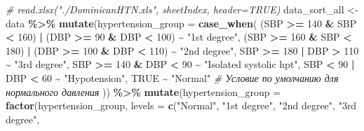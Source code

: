 \documentclass[
]{article}
\newenvironment{Shaded}{\begin{snugshade}}{\end{snugshade}}
\newcommand{\AttributeTok}[1]{\textcolor[rgb]{0.13,0.29,0.53}{#1}}
\newcommand{\CommentTok}[1]{\textcolor[rgb]{0.56,0.35,0.01}{\textit{#1}}}
\newcommand{\ConstantTok}[1]{\textcolor[rgb]{0.56,0.35,0.01}{#1}}
\newcommand{\DecValTok}[1]{\textcolor[rgb]{0.00,0.00,0.81}{#1}}
\newcommand{\FunctionTok}[1]{\textcolor[rgb]{0.13,0.29,0.53}{\textbf{#1}}}
\newcommand{\NormalTok}[1]{#1}
\newcommand{\OtherTok}[1]{\textcolor[rgb]{0.56,0.35,0.01}{#1}}
\newcommand{\SpecialCharTok}[1]{\textcolor[rgb]{0.81,0.36,0.00}{\textbf{#1}}}
\newcommand{\StringTok}[1]{\textcolor[rgb]{0.31,0.60,0.02}{#1}}
\begin{document}
\begin{Shaded}
\begin{Highlighting}[]
\CommentTok{\# read.xlsx("./DominicanHTN.xls", sheetIndex, header=TRUE)}
\NormalTok{data\_sort\_all }\OtherTok{\textless{}{-}}\NormalTok{ data }\SpecialCharTok{\%\textgreater{}\%}
  \FunctionTok{mutate}\NormalTok{(}\AttributeTok{hypertension\_group =} \FunctionTok{case\_when}\NormalTok{(}
\NormalTok{    (SBP }\SpecialCharTok{\textgreater{}=} \DecValTok{140} \SpecialCharTok{\&}\NormalTok{ SBP }\SpecialCharTok{\textless{}} \DecValTok{160}\NormalTok{) }\SpecialCharTok{|}\NormalTok{ (DBP }\SpecialCharTok{\textgreater{}=} \DecValTok{90} \SpecialCharTok{\&}\NormalTok{ DBP }\SpecialCharTok{\textless{}} \DecValTok{100}\NormalTok{) }\SpecialCharTok{\textasciitilde{}} \StringTok{"1st degree"}\NormalTok{,}
\NormalTok{    (SBP }\SpecialCharTok{\textgreater{}=} \DecValTok{160} \SpecialCharTok{\&}\NormalTok{ SBP }\SpecialCharTok{\textless{}} \DecValTok{180}\NormalTok{) }\SpecialCharTok{|}\NormalTok{ (DBP }\SpecialCharTok{\textgreater{}=} \DecValTok{100} \SpecialCharTok{\&}\NormalTok{ DBP }\SpecialCharTok{\textless{}} \DecValTok{110}\NormalTok{) }\SpecialCharTok{\textasciitilde{}} \StringTok{"2nd degree"}\NormalTok{,}
\NormalTok{    SBP }\SpecialCharTok{\textgreater{}=} \DecValTok{180} \SpecialCharTok{|}\NormalTok{ DBP }\SpecialCharTok{\textgreater{}} \DecValTok{110} \SpecialCharTok{\textasciitilde{}} \StringTok{"3rd degree"}\NormalTok{,}
\NormalTok{    SBP }\SpecialCharTok{\textgreater{}=} \DecValTok{140} \SpecialCharTok{\&}\NormalTok{ DBP }\SpecialCharTok{\textless{}} \DecValTok{90} \SpecialCharTok{\textasciitilde{}} \StringTok{"Isolated systolic hpt"}\NormalTok{,}
\NormalTok{    SBP }\SpecialCharTok{\textless{}} \DecValTok{90} \SpecialCharTok{|}\NormalTok{ DBP }\SpecialCharTok{\textless{}} \DecValTok{60} \SpecialCharTok{\textasciitilde{}} \StringTok{"Hypotension"}\NormalTok{,}
    \ConstantTok{TRUE} \SpecialCharTok{\textasciitilde{}} \StringTok{"Normal"}  \CommentTok{\# Условие по умолчанию для нормального давления}
\NormalTok{  )) }\SpecialCharTok{\%\textgreater{}\%} 
  \FunctionTok{mutate}\NormalTok{(}\AttributeTok{hypertension\_group =} \FunctionTok{factor}\NormalTok{(hypertension\_group, }
                                     \AttributeTok{levels =} \FunctionTok{c}\NormalTok{(}\StringTok{"Normal"}\NormalTok{,}
                                                \StringTok{"1st degree"}\NormalTok{, }
                                                \StringTok{"2nd degree"}\NormalTok{, }
                                                \StringTok{"3rd degree"}\NormalTok{,}

\end{Highlighting}
\end{Shaded}
\end{document}
